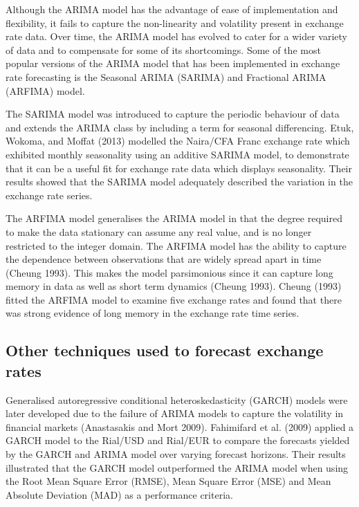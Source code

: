 \documentclass[12pt,a4paper]{article}
\numberwithin{equation}{section}
\numberwithin{figure}{section}
\numberwithin{table}{section}
\begin{document}
Although the ARIMA model has the advantage of ease of implementation and
flexibility, it fails to capture the non-linearity and volatility
present in exchange rate data. Over time, the ARIMA model has evolved to
cater for a wider variety of data and to compensate for some of its
shortcomings. Some of the most popular versions of the ARIMA model that
has been implemented in exchange rate forecasting is the Seasonal ARIMA
(SARIMA) and Fractional ARIMA (ARFIMA) model.

The SARIMA model was introduced to capture the periodic behaviour of
data and extends the ARIMA class by including a term for seasonal
differencing. Etuk, Wokoma, and Moffat (2013) modelled the Naira/CFA
Franc exchange rate which exhibited monthly seasonality using an
additive SARIMA model, to demonstrate that it can be a useful fit for
exchange rate data which displays seasonality. Their results showed that
the SARIMA model adequately described the variation in the exchange rate
series.

The ARFIMA model generalises the ARIMA model in that the degree required
to make the data stationary can assume any real value, and is no longer
restricted to the integer domain. The ARFIMA model has the ability to
capture the dependence between observations that are widely spread apart
in time (Cheung 1993). This makes the model parsimonious since it can
capture long memory in data as well as short term dynamics (Cheung
1993). Cheung (1993) fitted the ARFIMA model to examine five exchange
rates and found that there was strong evidence of long memory in the
exchange rate time series.

\subsection{Other techniques used to forecast exchange
rates}\label{other-techniques-used-to-forecast-exchange-rates}

Generalised autoregressive conditional heteroskedasticity (GARCH) models
were later developed due to the failure of ARIMA models to capture the
volatility in financial markets (Anastasakis and Mort 2009). Fahimifard
et al. (2009) applied a GARCH model to the Rial/USD and Rial/EUR to
compare the forecasts yielded by the GARCH and ARIMA model over varying
forecast horizons. Their results illustrated that the GARCH model
outperformed the ARIMA model when using the Root Mean Square Error
(RMSE), Mean Square Error (MSE) and Mean Absolute Deviation (MAD) as a
performance criteria.
\end{document}
